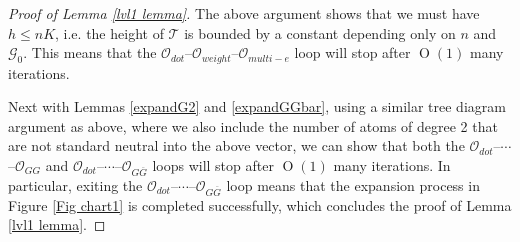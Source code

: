 \documentclass{article}
\newcommand{\1}{\mathds{1}}
\numberwithin{equation}{section}
\renewcommand{\cal}{\mathcal}
\renewcommand{\leq}{\leqslant}
\renewcommand{\le}{\leq}
\DeclareMathOperator{\OO}{O}
\theoremstyle{plain} %
\theoremstyle{remark}
\begin{document}
\begin{proof}[Proof of Lemma \ref{lvl1 lemma}]
The above argument shows that we must have $h\le nK$, i.e. the height of $\cal T$ is bounded by a constant depending only on $n$ and $\cal G_0$. 
This means that the $\cal O_{dot}$--${\cal O}_{weight}$--$\cal O_{multi-e}$ loop will stop after $\OO(1)$ many iterations.  



\vspace{5pt}


Next with Lemmas \ref{expandG2} and \ref{expandGGbar}, using a similar tree diagram argument as above, where we also include the number of atoms of degree 2 that are not standard neutral into the above vector, we can show that both the $\cal O_{dot}$--$\cdots$--$\cal O_{GG}$ and $\cal O_{dot}$--$\cdots$--$\cal O_{G\overline G}$ loops will stop after $\OO(1)$ many iterations. %
In particular, exiting the $\cal O_{dot}$--$\cdots$--$\cal O_{G\overline G}$ loop means that the expansion process in Figure \ref{Fig chart1} is completed successfully, which concludes the proof of Lemma \ref{lvl1 lemma}.
\end{proof}




%
%
\end{document}

